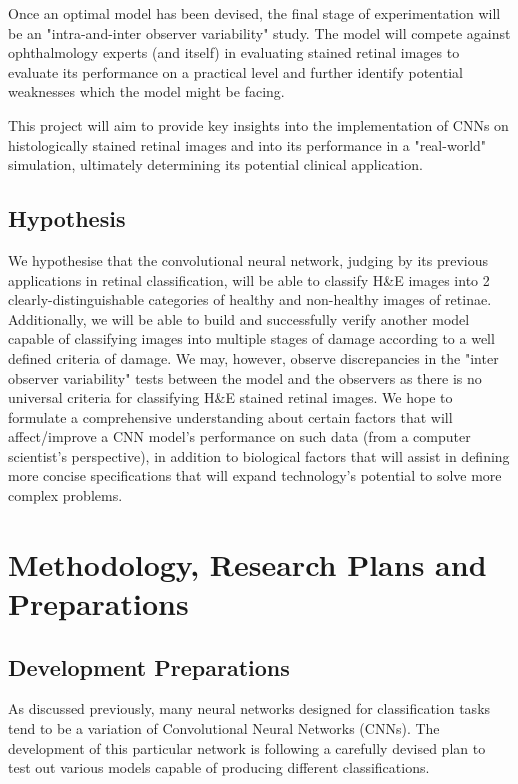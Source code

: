 \documentclass[a4paper]{article}
\begin{document}
        Once an optimal model has been devised, the final stage of experimentation will be an "intra-and-inter observer variability" study. The model will compete against ophthalmology experts (and itself) in evaluating stained retinal images to evaluate its performance on a practical level and further identify potential weaknesses which the model might be facing.
        \vspace{3mm}

        This project will aim to provide key insights into the implementation of CNNs on histologically stained retinal images and into its performance in a "real-world" simulation, ultimately determining its potential clinical application.  

    \subsection{Hypothesis}
        We hypothesise that the convolutional neural network, judging by its previous applications in retinal classification, will be able to classify H\&E images into 2 clearly-distinguishable categories of healthy and non-healthy images of retinae. Additionally, we will be able to build and successfully verify another model capable of classifying images into multiple stages of damage according to a well defined criteria of damage. We may, however, observe discrepancies in the "inter observer variability" tests between the model and the observers as there is no universal criteria for classifying H\&E stained retinal images. We hope to formulate a comprehensive understanding about certain factors that will affect/improve a CNN model's performance on such data (from a computer scientist's perspective), in addition to biological factors that will assist in defining more concise specifications that will expand technology's potential to solve more complex problems.

\pagebreak

\section{Methodology, Research Plans and Preparations}
    \subsection{Development Preparations}
        As discussed previously, many neural networks designed for classification tasks tend to be a variation of Convolutional Neural Networks (CNNs). The development of this particular network is following a carefully devised plan to test out various models capable of producing different classifications.
\end{document}
